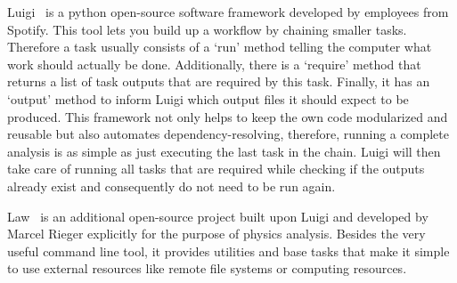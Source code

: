 
Luigi~\cite{luigi} is a python open-source software framework developed by employees from Spotify. This tool lets you build up a workflow by chaining smaller tasks. Therefore a task usually consists of a `run' method telling the computer what work should actually be done. Additionally, there is a `require' method that returns a list of task outputs that are required by this task. Finally, it has an `output' method to inform Luigi which output files it should expect to be produced. This framework not only helps to keep the own code modularized and reusable but also automates dependency-resolving, therefore, running a complete analysis is as simple as just executing the last task in the chain. Luigi will then take care of running all tasks that are required while checking if the outputs already exist and consequently do not need to be run again.

Law~\cite{law} is an additional open-source project built upon Luigi and developed by Marcel Rieger explicitly for the purpose of physics analysis. Besides the very useful command line tool, it provides utilities and base tasks that make it simple to use external resources like remote file systems or computing resources.
